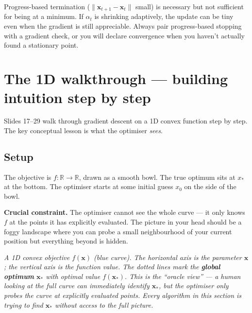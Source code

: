 \documentclass[11pt, a4paper]{article}
\begin{document}
\begin{pitfallbox}
Progress-based termination ($\|\mathbf{x}_{t+1} - \mathbf{x}_t\|$ small) is necessary but not sufficient for being at a minimum. If $\alpha_t$ is shrinking adaptively, the update can be tiny even when the gradient is still appreciable. Always pair progress-based stopping with a gradient check, or you will declare convergence when you haven't actually found a stationary point.
\end{pitfallbox}

\section{The 1D walkthrough — building intuition step by step}

Slides 17--29 walk through gradient descent on a 1D convex function step by step. The key conceptual lesson is what the optimiser \emph{sees}.

\subsection{Setup}

The objective is $f : \mathbb{R} \to \mathbb{R}$, drawn as a smooth bowl. The true optimum sits at $x_*$ at the bottom. The optimiser starts at some initial guess $x_0$ on the side of the bowl.

\textbf{Crucial constraint.} The optimiser cannot see the whole curve — it only knows $f$ at the points it has explicitly evaluated. The picture in your head should be a foggy landscape where you can probe a small neighbourhood of your current position but everything beyond is hidden.

\begin{center}

\footnotesize\textit{A 1D convex objective $f(\mathbf{x})$ (blue curve). The horizontal axis is the parameter $\mathbf{x}$; the vertical axis is the function value. The dotted lines mark the \textbf{global optimum} $\mathbf{x}_*$ with optimal value $f(\mathbf{x}_*)$. This is the ``oracle view'' --- a human looking at the full curve can immediately identify $\mathbf{x}_*$, but the optimiser only probes the curve at explicitly evaluated points. Every algorithm in this section is trying to find $\mathbf{x}_*$ without access to the full picture.}
\end{center}
\end{document}
